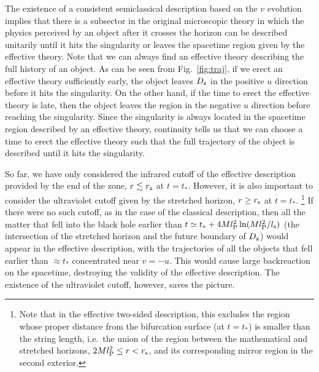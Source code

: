 \documentclass[12pt]{article}
\begin{document}
The existence of a consistent semiclassical description based on 
the $v$ evolution implies that there is a subsector in the original 
microscopic theory in which the physics perceived by an object 
after it crosses the horizon can be described unitarily until it 
hits the singularity or leaves the spacetime region given by the 
effective theory.  Note that we can always find an effective theory 
describing the full history of an object.  As can be seen from 
Fig.~\ref{fig:traj}, if we erect an effective theory sufficiently 
early, the object leaves $D_{\rm z}$ in the positive $u$ direction 
before it hits the singularity.  On the other hand, if the time 
to erect the effective theory is late, then the object leaves the 
region in the negative $u$ direction before reaching the singularity. 
Since the singularity is always located in the spacetime region 
described by an effective theory, continuity tells us that we can 
choose a time to erect the effective theory such that the full 
trajectory of the object is described until it hits the singularity.

So far, we have only considered the infrared cutoff of the effective 
description provided by the end of the zone, $r \lesssim r_{\rm z}$ 
at $t = t_*$.  However, it is also important to consider the 
ultraviolet cutoff given by the stretched horizon, $r \geq r_{\rm s}$ 
at $t = t_*$.%
\footnote{Note that in the effective two-sided description, this 
 excludes the region whose proper distance from the bifurcation 
 surface (at $t = t_*$) is smaller than the string length, i.e.\ 
 the union of the region between the mathematical and stretched 
 horizons, $2Ml_{\rm P}^2 \leq r < r_{\rm s}$, and its corresponding 
 mirror region in the second exterior.}
If there were no such cutoff, as in the case of the classical 
description, then all the matter that fell into the black hole earlier 
than $t \simeq t_* + 4Ml_{\rm P}^2 \ln(Ml_{\rm P}^2/l_{\rm s})$ (the 
intersection of the stretched horizon and the future boundary of 
$D_{\rm z}$) would appear in the effective description, with the 
trajectories of all the objects that fell earlier than $\approx t_*$ 
concentrated near $v = -u$.  This would cause large backreaction on 
the spacetime, destroying the validity of the effective description. 
The existence of the ultraviolet cutoff, however, saves the picture.
\end{document}
